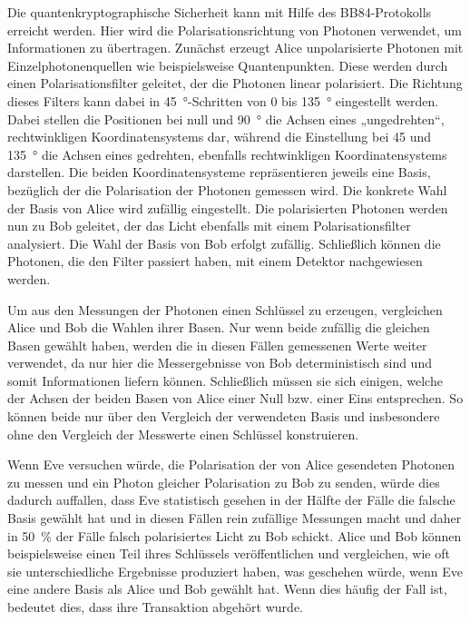 Die quantenkryptographische Sicherheit kann mit Hilfe des BB84-Protokolls
erreicht werden. Hier wird die Polarisationsrichtung von Photonen verwendet, um
Informationen zu übertragen. Zunächst erzeugt Alice unpolarisierte Photonen mit
Einzelphotonenquellen wie beispielsweise Quantenpunkten. Diese werden durch
einen Polarisationsfilter geleitet, der die Photonen linear polarisiert. Die
Richtung dieses Filters kann dabei in \SI{45}{\degree}-Schritten von 0 bis
\SI{135}{\degree} eingestellt werden. Dabei stellen die Positionen bei null und
\SI{90}{\degree} die Achsen eines „ungedrehten“, rechtwinkligen
Koordinatensystems dar, während die Einstellung bei 45 und \SI{135}{\degree} die
Achsen eines gedrehten, ebenfalls rechtwinkligen Koordinatensystems darstellen.
Die beiden Koordinatensysteme repräsentieren jeweils eine Basis, bezüglich der
die Polarisation der Photonen gemessen wird. Die konkrete Wahl der Basis von
Alice wird zufällig eingestellt. Die polarisierten Photonen werden nun zu Bob
geleitet, der das Licht ebenfalls mit einem Polarisationsfilter analysiert. Die
Wahl der Basis von Bob erfolgt zufällig. Schließlich können die Photonen, die
den Filter passiert haben, mit einem Detektor nachgewiesen werden.

Um aus den Messungen der Photonen einen Schlüssel zu erzeugen, vergleichen
Alice und Bob die Wahlen ihrer Basen. Nur wenn beide zufällig die gleichen Basen
gewählt haben, werden die in diesen Fällen gemessenen Werte weiter verwendet, da
nur hier die Messergebnisse von Bob deterministisch sind und somit Informationen
liefern können. Schließlich müssen sie sich einigen, welche der Achsen der
beiden Basen von Alice einer Null bzw. einer Eins entsprechen. So können beide
nur über den Vergleich der verwendeten Basis und insbesondere ohne den
Vergleich der Messwerte einen Schlüssel konstruieren.

Wenn Eve versuchen würde, die Polarisation der von Alice gesendeten Photonen zu
messen und ein Photon gleicher Polarisation zu Bob zu senden, würde dies
dadurch auffallen, dass Eve statistisch gesehen in der Hälfte der Fälle die
falsche Basis gewählt hat und in diesen Fällen rein zufällige Messungen macht
und daher in \SI{50}{\percent} der Fälle falsch polarisiertes Licht zu Bob
schickt. Alice und Bob können beispielsweise einen Teil ihres Schlüssels
veröffentlichen und vergleichen, wie oft sie unterschiedliche Ergebnisse
produziert haben, was geschehen würde, wenn Eve eine andere Basis als Alice und
Bob gewählt hat. Wenn dies häufig der Fall ist, bedeutet dies, dass ihre
Transaktion abgehört wurde. 

